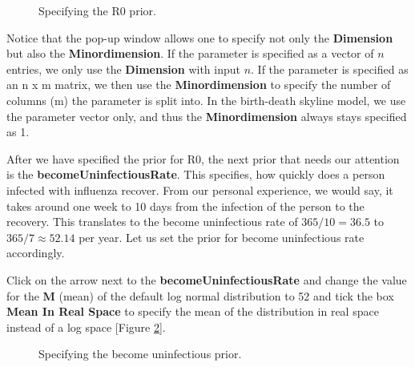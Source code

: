 \documentclass[11pt]{article}
\begin{document}
\begin{figure}[h!]
\centering
{}
\caption{\small Specifying the R0 prior.}
\label{R0Prior}
\end{figure}

Notice that the pop-up window allows one to specify not only the \textbf{Dimension} but also the \textbf{Minordimension}. If the parameter is specified as a vector of $n$ entries, we only use the \textbf{Dimension} with input $n$. If the parameter is specified as an n x m matrix, we then use the \textbf{Minordimension} to specify the number of columns (m) the parameter is split into. In the birth-death skyline model, we use the parameter vector only, and thus the \textbf{Minordimension} always stays specified as 1.

After we have specified the prior for R0, the next prior that needs our attention is the \textbf{becomeUninfectiousRate}. This specifies, how quickly does a person infected with influenza recover. From our personal experience, we would say, it takes around one week to 10 days from the infection of the person to the recovery. This translates to the become uninfectious rate of $365/10=36.5$ to $365/7\approx 52.14$ per year. Let us set the prior for become uninfectious rate accordingly.

\begin{framed}
 Click on the arrow next to the \textbf{becomeUninfectiousRate} and change the value for the \textbf{M} (mean) of the default log normal distribution to 52 and tick the box \textbf{Mean In Real Space} to specify the mean of the distribution in real space instead of a log space [Figure \ref{becomeUninfectiousPrior}].
\end{framed}

\begin{figure}[h!]
\centering
{}
\caption{\small Specifying the become uninfectious prior.}
\label{becomeUninfectiousPrior}
\end{figure}
\end{document}
